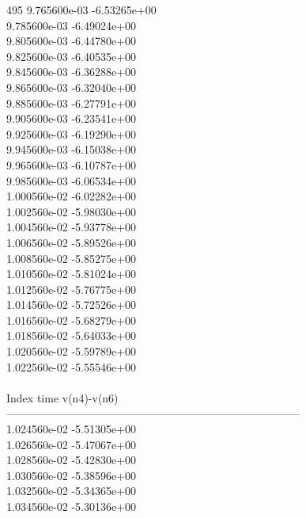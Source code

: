 495	9.765600e-03	-6.53265e+00	\\ 	9.785600e-03	-6.49024e+00	\\ 	9.805600e-03	-6.44780e+00	\\ 	9.825600e-03	-6.40535e+00	\\ 	9.845600e-03	-6.36288e+00	\\ 	9.865600e-03	-6.32040e+00	\\ 	9.885600e-03	-6.27791e+00	\\ 	9.905600e-03	-6.23541e+00	\\ 	9.925600e-03	-6.19290e+00	\\ 	9.945600e-03	-6.15038e+00	\\ 	9.965600e-03	-6.10787e+00	\\ 	9.985600e-03	-6.06534e+00	\\ 	1.000560e-02	-6.02282e+00	\\ 	1.002560e-02	-5.98030e+00	\\ 	1.004560e-02	-5.93778e+00	\\ 	1.006560e-02	-5.89526e+00	\\ 	1.008560e-02	-5.85275e+00	\\ 	1.010560e-02	-5.81024e+00	\\ 	1.012560e-02	-5.76775e+00	\\ 	1.014560e-02	-5.72526e+00	\\ 	1.016560e-02	-5.68279e+00	\\ 	1.018560e-02	-5.64033e+00	\\ 	1.020560e-02	-5.59789e+00	\\ 	1.022560e-02	-5.55546e+00	\\ \hline
\\ \hline
Index   time            v(n4)-v(n6)     \\ \hline
--------------------------------------------------------------------------------\\ 	1.024560e-02	-5.51305e+00	\\ 	1.026560e-02	-5.47067e+00	\\ 	1.028560e-02	-5.42830e+00	\\ 	1.030560e-02	-5.38596e+00	\\ 	1.032560e-02	-5.34365e+00	\\ 	1.034560e-02	-5.30136e+00	\\ \hline
